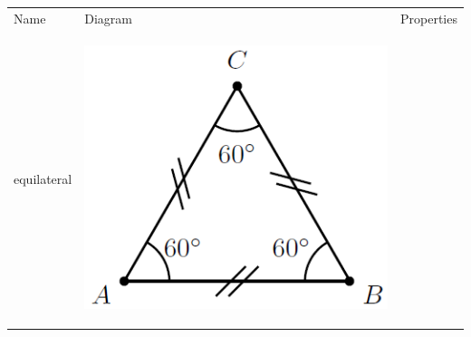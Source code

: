         \begin{center}
      \label{m39368*uid39}
    \noindent
      \tablelasttail{}
      \begin{xtabular*}{\mytablewidth}[t]{|p{10\mystarwidth}|p{10\mystarwidth}|p{10\mystarwidth}|}\hline
        Name &
        Diagram &
        Properties%
     \tabularnewline{}
        equilateral &
    \setcounter{subfigure}{0}
\label{m39368*id317558}
    \begin{center}
    \label{m39368*id317558!!!underscore!!!media}\label{m39368*id317558!!!underscore!!!printimage}\includegraphics{col11306.imgs/m39368_MG10C13_023.png} %

\end{center}
\end{xtabular*}
\end{center}
